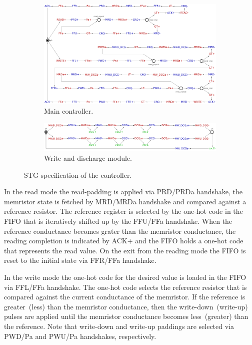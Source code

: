 \documentclass[twocolumn,conference]{IEEEtran}
\begin{document}
\begin{figure}[ht]
    \centering
    \begin{subfigure}[b]{\textwidth}
        \centering
        \includegraphics[scale=0.2]{figs/main_ctrl_stg}
        \caption{Main controller.}
        \label{fig:MainControlSTG}
    \end{subfigure}
	\vspace{10pt}

    \begin{subfigure}[b]{\textwidth}
        \centering
        \includegraphics[scale=0.2]{figs/write_discharge_csc_stg}
        \caption{Write and discharge module.}
        \label{fig:WriteDischargeSTG}
    \end{subfigure}
    \caption{STG specification of the controller.}
    \label{fig:ControlSTG}
\end{figure}

In the read mode the read-padding is applied via PRD/PRDa handshake, the memristor state is fetched by MRD/MRDa handshake and compared against a reference resistor. The reference register is selected by the one-hot code in the FIFO that is iteratively shifted up by the FFU/FFa handshake. When the reference conductance becomes grater than the memristor conductance, the reading completion is indicated by ACK$+$ and the FIFO holds a one-hot code that represents the read value.  On the exit from the reading mode the FIFO is reset to the initial state via FFR/FFa handshake.

In the write mode the one-hot code for the desired value is loaded in the FIFO via FFL/FFa handshake. The one-hot code selects the reference resistor that is compared against the current conductance of the memristor. If the reference is greater~(less) than the memristor conductance, then the write-down~(write-up) pulses are applied until the memristor conductance becomes less~(greater) than the reference. Note that write-down and write-up paddings are selected via PWD/Pa and PWU/Pa handshakes, respectively.
\end{document}
